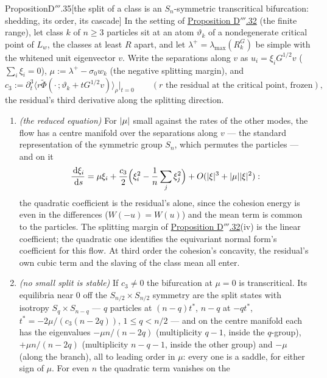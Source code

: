 \begin{thm}{Proposition}{D$'''$.35}[the split of a class is an $S_n$-symmetric transcritical bifurcation: shedding, its
order, its cascade]\label{res:thmDppp:35}%
In the setting of \hyperref[res:thmDppp:32]{Proposition D$'''$.32} (the finite range), let class $k$ of $n\ge3$
particles sit at an atom $\vartheta_k$ of a nondegenerate critical point of $L_w$, the classes at least $R$ apart, and
let $\lambda^+ = \lambda_{\max}(R^G_k)$ be simple with the whitened unit eigenvector $v$. Write the separations along
$v$ as $u_i = \xi_iG^{1/2}v$ ($\sum_i\xi_i = 0$), $\mu := \lambda^+ - \sigma_0w_k$ (the negative splitting margin), and
\[
  c_3 := \partial^3_t\langle r\tilde\Phi(\cdot\,;\vartheta_k + tG^{1/2}v)\rangle_\rho\big|_{t=0}
  \qquad(\text{$r$ the residual at the critical point, frozen}),
\]
the residual's third derivative along the splitting direction.
\begin{enumerate}[label=\textup{(\roman*)}]
  \item \emph{(the reduced equation)} For $\lvert \mu\rvert$ small against the rates of the other modes, the flow has a
    centre manifold over the separations along $v$ --- the standard representation of the symmetric group $S_n$,
    which permutes the particles --- and on it
    \[
      \frac{\,\mathrm{d}\xi_i}{\,\mathrm{d} s} = \mu\xi_i + \frac{c_3}2\Big(\xi_i^2 - \frac1n\sum_j\xi_j^2\Big)
      + O(\lvert \xi\rvert^3 + \lvert \mu\rvert\lvert \xi\rvert^2):
    \]
    the quadratic coefficient is the residual's alone, since the cohesion energy is even in the differences
    ($W(-u) = W(u)$) and the mean term is common to the particles. The splitting margin of
    \hyperref[res:thmDppp:32]{Proposition D$'''$.32}(iv) is the linear coefficient; the quadratic one identifies the
    equivariant normal form's coefficient for this flow. At third order the cohesion's concavity, the residual's own
    cubic term and the slaving of the class mean all enter.
  \item \emph{(no small split is stable)} If $c_3\ne0$ the bifurcation at $\mu = 0$ is transcritical. Its equilibria
    near 0 off the $S_{n/2}\times S_{n/2}$ symmetry are the split states with isotropy $S_q\times S_{n-q}$ --- $q$
    particles at $(n - q)t^*$, $n - q$ at $-qt^*$, $t^* = -2\mu/(c_3(n - 2q))$, $1\le q < n/2$ --- and on the centre
    manifold each has the eigenvalues $-\mu n/(n - 2q)$ (multiplicity $q - 1$, inside the $q$-group),
    $+\mu n/(n - 2q)$ (multiplicity $n - q - 1$, inside the other group) and $-\mu$ (along the branch), all to leading
    order in $\mu$: every one is a saddle, for either sign of $\mu$. For even $n$ the quadratic term vanishes on the

\end{enumerate}
\end{thm}
